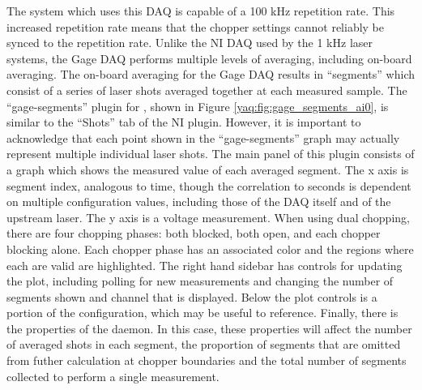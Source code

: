 The system which uses this DAQ is capable of a 100 kHz repetition rate.
This increased repetition rate means that the chopper settings cannot reliably be synced to the repetition rate.
Unlike the NI DAQ used by the 1 kHz laser systems, the Gage DAQ performs multiple levels of averaging, including on-board averaging.
The on-board averaging for the Gage DAQ results in ``segments'' which consist of a series of laser shots averaged together at each measured sample.
The ``gage-segments'' plugin for \yaqcqtpy{}, shown in Figure \ref{yaq:fig:gage_segments_ai0}, is similar to the ``Shots'' tab of the NI plugin.
However, it is important to acknowledge that each point shown in the ``gage-segments'' graph may actually represent multiple individual laser shots.
The main panel of this plugin consists of a graph which shows the measured value of each averaged segment.
The x axis is segment index, analogous to time, though the correlation to seconds is dependent on multiple configuration values, including those of the DAQ itself and of the upstream laser.
The y axis is a voltage measurement.
When using dual chopping, there are four chopping phases: both blocked, both open, and each chopper blocking alone.
Each chopper phase has an associated color and the regions where each are valid are highlighted.
The right hand sidebar has controls for updating the plot, including polling for new measurements and changing the number of segments shown and channel that is displayed.
Below the plot controls is a portion of the configuration, which may be useful to reference.
Finally, there is the properties of the daemon.
In this case, these properties will affect the number of averaged shots in each segment, the proportion of segments that are omitted from futher calculation at chopper boundaries and the total number of segments collected to perform a single measurement.


